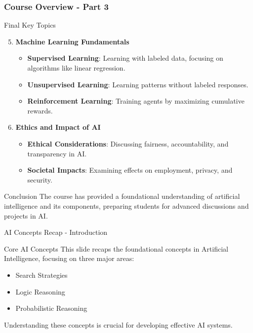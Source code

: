 \documentclass[aspectratio=169]{beamer}
\begin{document}
\begin{frame}[fragile]
    \frametitle{Course Overview - Part 3}
    \begin{block}{Final Key Topics}
        \begin{enumerate}
            \setcounter{enumi}{4}
            \item \textbf{Machine Learning Fundamentals}
                \begin{itemize}
                    \item \textbf{Supervised Learning}: Learning with labeled data, focusing on algorithms like linear regression.
                    \item \textbf{Unsupervised Learning}: Learning patterns without labeled responses.
                    \item \textbf{Reinforcement Learning}: Training agents by maximizing cumulative rewards.
                \end{itemize}
            \item \textbf{Ethics and Impact of AI}
                \begin{itemize}
                    \item \textbf{Ethical Considerations}: Discussing fairness, accountability, and transparency in AI.
                    \item \textbf{Societal Impacts}: Examining effects on employment, privacy, and security.
                \end{itemize}
        \end{enumerate}
    \end{block}

    \begin{block}{Conclusion}
        The course has provided a foundational understanding of artificial intelligence and its components, preparing students for advanced discussions and projects in AI.
    \end{block}
\end{frame}

\begin{frame}[fragile]{AI Concepts Recap - Introduction}
    \begin{block}{Core AI Concepts}
        This slide recaps the foundational concepts in Artificial Intelligence, focusing on three major areas:
        \begin{itemize}
            \item Search Strategies
            \item Logic Reasoning
            \item Probabilistic Reasoning
        \end{itemize}
        Understanding these concepts is crucial for developing effective AI systems.
    \end{block}
\end{frame}
\end{document}
